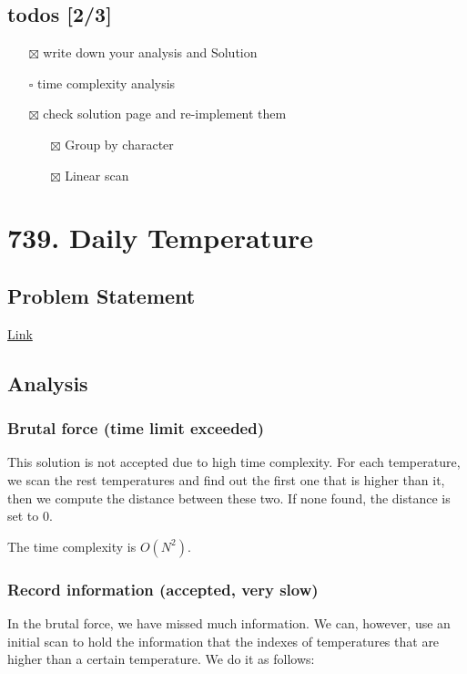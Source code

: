 \documentclass[12pt]{article}
\begin{document}
\subsection{todos [2/3]}
\label{sec:orgd1e04be}
\begin{itemize}
\item[{$\boxtimes$}] write down your analysis and Solution
\item[{$\square$}] time complexity analysis
\item[{$\boxtimes$}] check solution page and re-implement them
\begin{itemize}
\item[{$\boxtimes$}] Group by character
\item[{$\boxtimes$}] Linear scan
\end{itemize}
\end{itemize}
\section{739. Daily Temperature}
\label{sec:org243d037}
\subsection{Problem Statement}
\label{sec:org4a286ac}
\href{https://leetcode.com/problems/daily-temperatures/}{Link}
\subsection{Analysis}
\label{sec:org9b81a2d}
\subsubsection{Brutal force (time limit exceeded)}
\label{sec:org88d84c5}
This solution is not accepted due to high time complexity. For each temperature, we scan the rest temperatures and find out the first one that is higher than it, then we compute the distance between these two. If none found, the distance is set to 0.

The time complexity is \(O(N^2)\).
\subsubsection{Record information (accepted, very slow)}
\label{sec:org349572a}
In the brutal force, we have missed much information. We can, however, use an initial scan to hold the information that the indexes of temperatures that are higher than a certain temperature. We do it as follows:
\end{document}
